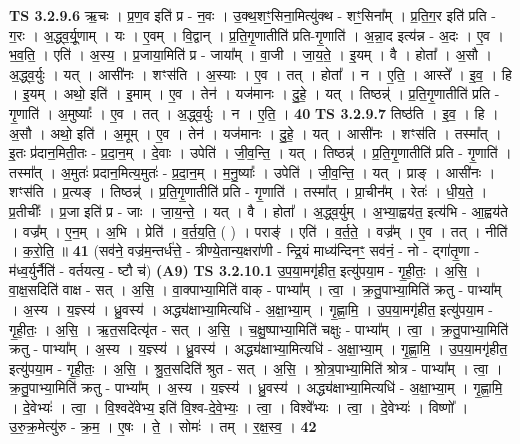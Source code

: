 \documentclass[17pt]{extarticle}
\begin{document}
                  \newline
                                \textbf{ TS 3.2.9.6} \newline
                  ऋ॒चः । प्र॒ण॒व इति॑ प्र - न॒वः । उ॒क्थ॒शꣳ॒॒सिना॒मित्यु॑क्थ - शꣳ॒॒सिना᳚म् । प्र॒ति॒ग॒र इति॑ प्रति - ग॒रः । अ॒द्ध्व॒र्यू॒णाम् । यः । ए॒वम् । वि॒द्वान् । प्र॒ति॒गृ॒णातीति॑ प्रति-गृ॒णाति॑ । अ॒न्ना॒द इत्य॑न्न - अ॒दः । ए॒व । भ॒व॒ति॒ । एति॑ । अ॒स्य॒ । प्र॒जाया॒मिति॑ प्र - जाया᳚म् । वा॒जी । जा॒य॒ते॒ । इ॒यम् । वै । होता᳚ । अ॒सौ । अ॒द्ध्व॒र्युः । यत् । आसी॑नः । शꣳस॑ति । अ॒स्याः । ए॒व । तत् । होता᳚ । न । ए॒ति॒ । आस्ते᳚ । इ॒व॒ । हि । इ॒यम् । अथो॒ इति॑ । इ॒माम् । ए॒व । तेन॑ । यज॑मानः । दु॒हे॒ । यत् । तिष्ठन्न्॑ । प्र॒ति॒गृ॒णातीति॑ प्रति - गृ॒णाति॑ । अ॒मुष्याः᳚ । ए॒व । तत् । अ॒द्ध्व॒र्युः । न । ए॒ति॒ । \textbf{  40} \newline
                  \newline
                                \textbf{ TS 3.2.9.7} \newline
                  तिष्ठ॑ति । इ॒व॒ । हि । अ॒सौ । अथो॒ इति॑ । अ॒मूम् । ए॒व । तेन॑ । यज॑मानः । दु॒हे॒ । यत् । आसी॑नः । शꣳस॑ति । तस्मा᳚त् । इ॒तः प्र॑दान॒मिती॒तः - प्र॒दा॒न॒म् । दे॒वाः । उपेति॑ । जी॒व॒न्ति॒ । यत् । तिष्ठन्न्॑ । प्र॒ति॒गृ॒णातीति॑ प्रति - गृ॒णाति॑ । तस्मा᳚त् । अ॒मुतः॑ प्रदान॒मित्य॒मुतः॑ - प्र॒दा॒न॒म् । म॒नु॒ष्याः᳚ । उपेति॑ । जी॒व॒न्ति॒ । यत् । प्राङ् । आसी॑नः । शꣳस॑ति । प्र॒त्यङ् । तिष्ठन्न्॑ । प्र॒ति॒गृ॒णातीति॑ प्रति - गृ॒णाति॑ । तस्मा᳚त् । प्रा॒चीन᳚म् । रेतः॑ । धी॒य॒ते॒ । प्र॒तीचीः᳚ । प्र॒जा इति॑ प्र - जाः । जा॒य॒न्ते॒ । यत् । वै । होता᳚ । अ॒द्ध्व॒र्युम् । अ॒भ्या॒ह्वय॑त॒ इत्य॑भि - आ॒ह्वय॑ते । वज्र᳚म् । ए॒न॒म् । अ॒भि । प्रेति॑ । व॒र्त॒य॒ति॒ ( ) । पराङ्॑ । एति॑ । व॒र्त॒ते॒ । वज्र᳚म् । ए॒व । तत् । नीति॑ । क॒रो॒ति॒ ॥ \textbf{  41} \newline
                  \newline
                      (सव॑ने॒ वज्र॑म॒न्तर्ध॑त्ते॒ - त्रीण्ये॒तान्य॒क्षरा॑णी - न्द्रि॒यं माध्य॑न्दिनꣳ॒॒ सव॑नं॒ - नो - द्गा॑तृ॒णा - म॑ध्व॒र्युर्नैति॑ - वर्तयत्य॒ - ष्टौ च॑)  \textbf{(A9)} \newline \newline
                                \textbf{ TS 3.2.10.1} \newline
                  उ॒प॒या॒मगृ॑हीत॒ इत्यु॑पया॒म - गृ॒ही॒तः॒ । अ॒सि॒ । वा॒क्ष॒सदिति॑ वाक्ष - सत् । अ॒सि॒ । वा॒क्पाभ्या॒मिति॑ वाक् - पाभ्या᳚म् । त्वा॒ । क्र॒तु॒पाभ्या॒मिति॑ क्रतु - पाभ्या᳚म् । अ॒स्य । य॒ज्ञ्स्य॑ । ध्रु॒वस्य॑ । अद्ध्य॑क्षाभ्या॒मित्यधि॑ - अ॒क्षा॒भ्या॒म् । गृ॒ह्णा॒मि॒ । उ॒प॒या॒मगृ॑हीत॒ इत्यु॑पया॒म - गृ॒ही॒तः॒ । अ॒सि॒ । ऋ॒त॒सदित्यृ॑त - सत् । अ॒सि॒ । च॒क्षु॒ष्पाभ्या॒मिति॑ चक्षुः - पाभ्या᳚म् । त्वा॒ । क्र॒तु॒पाभ्या॒मिति॑ क्रतु - पाभ्या᳚म् । अ॒स्य । य॒ज्ञ्स्य॑ । ध्रु॒वस्य॑ । अद्ध्य॑क्षाभ्या॒मित्यधि॑ - अ॒क्षा॒भ्या॒म् । गृ॒ह्णा॒मि॒ । उ॒प॒या॒मगृ॑हीत॒ इत्यु॑पया॒म - गृ॒ही॒तः॒ । अ॒सि॒ । श्रु॒त॒सदिति॑ श्रुत - सत् । अ॒सि॒ । श्रो॒त्र॒पाभ्या॒मिति॑ श्रोत्र - पाभ्या᳚म् । त्वा॒ । क्र॒तु॒पाभ्या॒मिति॑ क्रतु - पाभ्या᳚म् । अ॒स्य । य॒ज्ञ्स्य॑ । ध्रु॒वस्य॑ । अद्ध्य॑क्षाभ्या॒मित्यधि॑ - अ॒क्षा॒भ्या॒म् । गृ॒ह्णा॒मि॒ । दे॒वेभ्यः॑ । त्वा॒ । वि॒श्वदे॑वेभ्य॒ इति॑ वि॒श्व-दे॒वे॒भ्यः॒ । त्वा॒ । विश्वे᳚भ्यः । त्वा॒ । दे॒वेभ्यः॑ । विष्णो᳚ । उ॒रु॒क्र॒मेत्यु॑रु - क्र॒म॒ । ए॒षः । ते॒ । सोमः॑ । तम् । र॒क्ष॒स्व॒ । \textbf{  42} \newline
\end{document}
